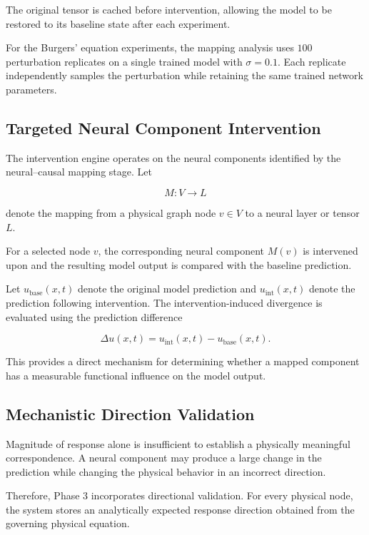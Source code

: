 \documentclass[12pt,singleside,a4paper]{article}
\begin{document}
The original tensor is cached before intervention, allowing the model
to be restored to its baseline state after each experiment.

For the Burgers' equation experiments, the mapping analysis uses
$100$ perturbation replicates on a single trained model with
$\sigma = 0.1$. Each replicate independently samples the perturbation
while retaining the same trained network parameters.


\subsection{Targeted Neural Component Intervention}

The intervention engine operates on the neural components identified
by the neural--causal mapping stage. Let

\begin{equation}
    M : V \rightarrow L
\end{equation}

denote the mapping from a physical graph node $v \in V$ to a neural
layer or tensor $L$.

For a selected node $v$, the corresponding neural component $M(v)$ is
intervened upon and the resulting model output is compared with the
baseline prediction.

Let $u_{\mathrm{base}}(x,t)$ denote the original model prediction and
$u_{\mathrm{int}}(x,t)$ denote the prediction following intervention.
The intervention-induced divergence is evaluated using the prediction
difference

\begin{equation}
    \Delta u(x,t)
    =
    u_{\mathrm{int}}(x,t)
    -
    u_{\mathrm{base}}(x,t).
\end{equation}

This provides a direct mechanism for determining whether a mapped
component has a measurable functional influence on the model output.


\subsection{Mechanistic Direction Validation}

Magnitude of response alone is insufficient to establish a physically
meaningful correspondence. A neural component may produce a large
change in the prediction while changing the physical behavior in an
incorrect direction.

Therefore, Phase 3 incorporates directional validation. For every
physical node, the system stores an analytically expected response
direction obtained from the governing physical equation.
\end{document}
